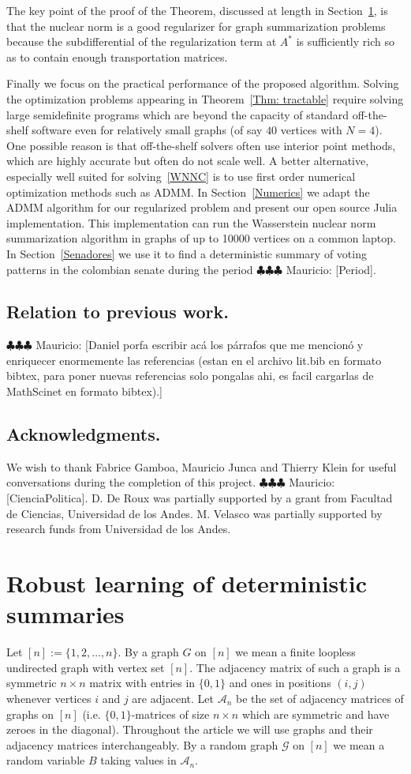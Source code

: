 \documentclass[12pt]{amsart}
\theoremstyle{remark}
\newcommand{\grG}{{\mathcal{G}}}
\newcommand{\mv}[1]{{\color{red} \sf $\clubsuit\clubsuit\clubsuit$ Mauricio: [#1]}}
\begin{document}
The key point of the proof of the Theorem, discussed at length in Section~\ref{}, is that the nuclear norm is a good regularizer for graph summarization problems because the subdifferential of the regularization term at $A^*$ is sufficiently rich so as to contain enough transportation matrices. 

Finally we focus on the practical performance of the proposed algorithm. Solving the optimization problems appearing in Theorem~\ref{Thm: tractable} require solving large semidefinite programs which are beyond the  capacity of standard off-the-shelf software even for relatively small graphs (of say $40$ vertices with $N=4$). One possible reason is that off-the-shelf solvers often use interior point methods, which are highly accurate but often do not scale well. A better alternative, especially well suited for solving~\ref{WNNC} is to use first order numerical optimization methods such as ADMM. In Section~\ref{Numerics} we adapt the ADMM algorithm for our regularized problem and present our open source Julia implementation. This implementation can run the Wasserstein nuclear norm summarization algorithm in graphs of up to 10000 vertices on a common laptop. In Section~\ref{Senadores} we use it to find a deterministic summary of voting patterns in the colombian senate during the period \mv{Period}. 

\subsection{Relation to previous work.}
\mv{Daniel porfa escribir ac\'a los p\'arrafos que me mencion\'o y enriquecer enormemente las referencias (estan en el archivo lit.bib en formato bibtex, para poner nuevas referencias solo pongalas ahi, es facil cargarlas de MathScinet en formato bibtex).} 

\subsection{Acknowledgments.}
We wish to thank Fabrice Gamboa, Mauricio Junca and Thierry Klein for useful conversations during the completion of this project. \mv{CienciaPolitica}.
D. De Roux was partially supported by a grant from Facultad de Ciencias, Universidad de los Andes. M. Velasco was partially supported by research funds from Universidad de los Andes. 


\section{Robust learning of deterministic summaries}
Let $[n]:=\{1,2,\dots, n\}$. By a graph $G$ on $[n]$ we mean a finite loopless undirected graph with vertex set $[n]$. The adjacency matrix of such a graph is a symmetric $n\times n$ matrix with entries in $\{0,1\}$ and ones in positions $(i,j)$ whenever vertices $i$ and $j$ are adjacent. Let $\mathcal{A}_n$ be the set of adjacency matrices of graphs on $[n]$ (i.e. $\{0,1\}$-matrices of size $n\times n$ which are symmetric and have zeroes in the diagonal). Throughout the article we will use graphs and their adjacency matrices interchangeably. By a random graph $\grG$ on $[n]$ we mean a random variable $B$ taking values in $\mathcal{A}_n$.
\end{document}
